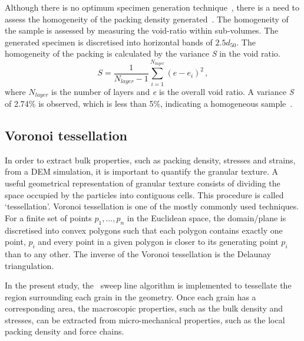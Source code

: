 Although there is no optimum specimen generation 
technique~\citep{OSullivan2011}, there is a need to assess the homogeneity of 
the packing density generated~\citep{Jiang2003}. The homogeneity of the sample 
is assessed by measuring the void-ratio within sub-volumes. The generated 
specimen is discretised into horizontal bands of $2.5d_{50}$. The homogeneity 
of the packing is calculated by the variance \textit{S} in the void ratio.
%
\begin{equation}
S=\frac{1}{N_{layer}-1}\sum\limits_{i=1}^{N_{layer}}(e - e_i)^2 \,,
\end{equation}
%
where $N_{layer}$ is the number of layers and \textit{e} is the overall void 
ratio. A variance \textit{S} of 2.74\% is observed, which is less than 
5\%, indicating a homogeneous sample~\citep{Jiang2003}.


\subsection{Voronoi tessellation}

In order to extract bulk properties, such as packing density, stresses and 
strains, from a DEM simulation, it is important to quantify the granular 
texture. A useful geometrical representation of granular texture consists of 
dividing the space occupied by the particles into contiguous cells. This 
procedure is called `tessellation'. Voronoi tessellation is one of the mostly 
commonly used techniques. For a finite set of points $p_1, \dots, p_n$ in the 
Euclidean space, the domain/plane is discretised into convex polygons such that 
each polygon contains exactly one point, $p_i$ and every point in a given 
polygon is closer to its generating point $p_i$ than to any other. The inverse 
of the Voronoi tessellation is the Delaunay triangulation.

In the present study, the~\citet{Fortune1992} sweep line algorithm is 
implemented to tessellate the region surrounding each grain in the geometry. 
Once each grain has a corresponding area, the macroscopic properties, such as 
the bulk density and stresses, can be extracted from micro-mechanical 
properties, such as the local packing density and force chains.

